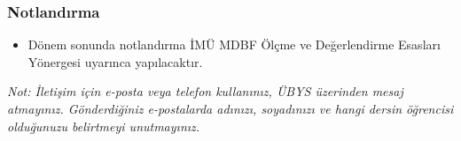 \documentclass{article}
\begin{document}
\subsubsection*{Notlandırma}

\begin{itemize}

\item Dönem sonunda notlandırma İMÜ MDBF Ölçme ve Değerlendirme Esasları Yönergesi uyarınca yapılacaktır.


\end{itemize}

\bigskip

\noindent
\textit{Not: İletişim için e-posta veya telefon kullanınız, ÜBYS üzerinden mesaj atmayınız. Gönderdiğiniz e-postalarda adınızı, soyadınızı ve hangi dersin öğrencisi olduğunuzu belirtmeyi unutmayınız.}
	
\end{document}
